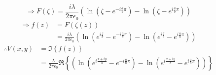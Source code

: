 \[
    \Rightarrow F(\zeta)
    = \frac{i\lambda}{2\pi\epsilon_0} \left(
        \ln \left( \zeta - e^{-i\frac{a}{b}\pi} \right)
        - \ln \left( \zeta - e^{i\frac{a}{b}\pi} \right)
    \right)
\]
\begin{align*}
    \Rightarrow f(z)
    &= F(\zeta(z)) \\
    &= \frac{i\lambda}{2\pi\epsilon_0} \left(
        \ln \left( e^{i\frac{z}{b}} - e^{-i\frac{a}{b}\pi} \right)
        - \ln \left( e^{i\frac{z}{b}} - e^{i\frac{a}{b}\pi} \right)
    \right)
\end{align*}
\begin{align*}
    \therefore V(x, y)
    &= \Im \left\{ f(z) \right\} \\
    &= \frac{\lambda}{2\pi\epsilon_0} \Re \left\{ \left(
        \ln \left( e^{i\frac{x + iy}{b}} - e^{-i\frac{a}{b}\pi} \right)
        - \ln \left( e^{i\frac{x + iy}{b}} - e^{i\frac{a}{b}\pi} \right)
    \right) \right\}
\end{align*}
